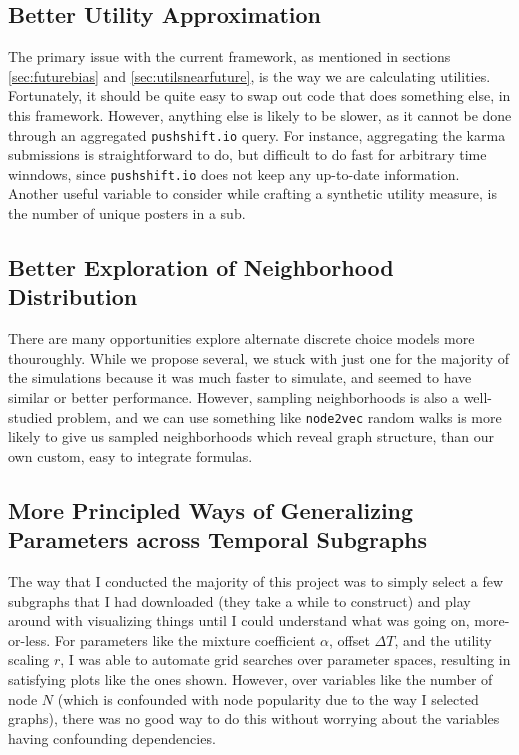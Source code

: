 \documentclass{article}
\theoremstyle{definition}
\begin{document}
	\subsection{Better Utility Approximation}
	The primary issue with the current framework, as mentioned in sections \ref{sec:futurebias} and \ref{sec:utilsnearfuture}, is the way we are calculating utilities. Fortunately, it should be quite easy to swap out code that does something else, in this framework. However, anything else is likely to be slower, as it cannot be done through an aggregated \texttt{pushshift.io} query. For instance, aggregating the karma submissions is straightforward to do, but difficult to do fast for arbitrary time winndows, since \texttt{pushshift.io} does not keep any up-to-date information. Another useful variable to consider while crafting a synthetic utility measure, is the number of unique posters in a sub.
	
		
	\subsection{Better Exploration of Neighborhood Distribution}
	
	There are many opportunities explore alternate discrete choice models more thouroughly. While we propose several, we stuck with just one for the majority of the simulations because it was much faster to simulate, and seemed to have similar or better performance. However, sampling neighborhoods is also a well-studied problem, and we can use something like \texttt{node2vec} \cite{grover2016node2vec} random walks is more likely to give us sampled neighborhoods which reveal graph structure, than our own custom, easy to integrate formulas.
	
	
	\subsection{More Principled Ways of Generalizing Parameters across Temporal Subgraphs}
	The way that I conducted the majority of this project was to simply select a few subgraphs that I had downloaded (they take a while to construct) and play around with visualizing things until I could understand what was going on, more-or-less. For parameters like the mixture coefficient $\alpha$, offset $\Delta T$, and the utility scaling $r$, I was able to automate grid searches over parameter spaces, resulting in satisfying plots like the ones shown. However, over variables like the number of node $N$ (which is confounded with node popularity due to the way I selected graphs), there was no good way to do this without worrying about the variables having confounding dependencies.
	
\end{document}
